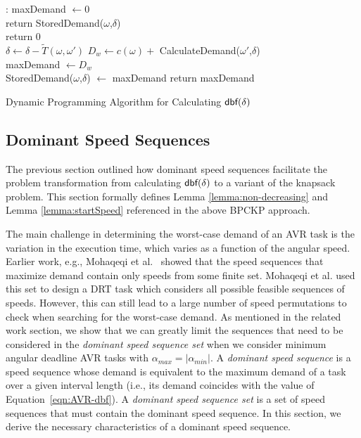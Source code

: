 \begin{algorithm}
\begin{algorithmic}[1]
:
\State maxDemand $\gets 0$
\\
\State return StoredDemand($\omega$,$\delta$)
\EndIf    
\\
\State return 0
\EndIf
\\
 
\State $\delta \gets \delta-\widetilde{T}(\omega,\omega')$
\State $D_w \gets c(\omega) +$ CalculateDemand($\omega'$,$\delta$)\\
\State maxDemand $\gets D_w$
\EndIf
\EndFor
\\
\State StoredDemand($\omega$,$\delta$) $\gets$ maxDemand
\State return maxDemand
\EndFunction
\end{algorithmic}
\caption{Dynamic Programming Algorithm for Calculating $\mbox{\sf dbf}(\delta)$}
\label{algo}
\end{algorithm}

\subsection{Dominant Speed Sequences}
\label{sec:filterSeq}
The previous section outlined how dominant speed sequences facilitate the problem transformation from calculating $\mbox{\sf dbf}(\delta)$ to a variant of the knapsack problem.
This section formally defines Lemma \ref{lemma:non-decreasing} and Lemma \ref{lemma:startSpeed}
referenced in the above BPCKP approach.

The main challenge in determining the worst-case demand of an AVR task is the variation in the execution time, which varies as a function of the angular speed. 
Earlier work, e.g., Mohaqeqi et al.~\cite{mohaqeqi_refinement_2017} showed that the speed sequences that maximize demand contain only speeds from some finite set.
 Mohaqeqi et al. used this set to design a DRT task which considers all possible feasible sequences of speeds.
 However, this can still lead to a large number of speed permutations to check when searching for the worst-case demand.
 As mentioned in the related work section, we show that we can greatly limit the sequences that need to be considered in the \emph{dominant speed sequence set} when we consider minimum angular deadline AVR tasks with $\alpha_{max} = |\alpha_{min}|$.
  A \emph{dominant speed sequence} is  a speed sequence whose demand is equivalent to the maximum demand of a task over a given interval length (i.e., its demand coincides with the value of Equation~\ref{eqn:AVR-dbf}).
 A \textit{dominant speed sequence set} is a set of speed sequences that must contain the dominant speed sequence.
In this section, we derive the necessary characteristics of a dominant speed sequence.
\vspace{-1mm}
